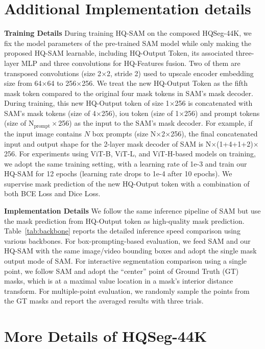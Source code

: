 \section{Additional Implementation details} 
\label{sec:details}

\textbf{Training Details} During training HQ-SAM on the composed HQSeg-44K, we fix the model parameters of the pre-trained SAM model while only making the proposed HQ-SAM learnable, including HQ-Output Token, its associated three-layer MLP and three convolutions for HQ-Features fusion. Two of them are transposed convolutions (size 2$\times$2, stride 2) used to upscale encoder embedding size from 64$\times$64 to 256$\times$256.
We treat the new HQ-Output Token as the fifth mask token compared to the original four mask tokens in SAM's mask decoder. During training, this new HQ-Output token of size 1$\times$256 is concatenated with SAM's mask tokens (size of 4$\times$256), iou token (size of 1$\times$256) and prompt tokens (size of N$_\text{prompt}\times$256) as the input to the SAM's mask decoder. For example, if the input image contains $N$ box prompts (size N$\times$2$\times$256), the final concatenated input and output shape for the 2-layer mask decoder of SAM is N$\times$(1+4+1+2)$\times$256. 
For experiments using ViT-B, ViT-L, and ViT-H-based models on training, we adopt the same training setting, with a learning rate of 1e-3 and train our HQ-SAM for 12 epochs (learning rate drops to 1e-4 after 10 epochs). We supervise mask prediction of the new HQ-Output token with a combination of both BCE Loss and Dice Loss.

\textbf{Implementation Details} We follow the same inference pipeline of SAM but use the mask prediction from HQ-Output token as high-quality mask prediction. Table~\ref{tab:backbone}  reports the detailed inference speed comparison using various backbones. For box-prompting-based evaluation, we feed SAM and our HQ-SAM with the same image/video bounding boxes and adopt the single mask output mode of SAM. For interactive segmentation comparison using a single point, we follow SAM and adopt the ``center'' point of Ground Truth (GT) masks, which is at a maximal value location in a mask’s interior distance transform. For multiple-point evaluation, we randomly sample the points from the GT masks and report the averaged results with three trials.

\section{More Details of HQSeg-44K} 
\label{sec:datasets}


